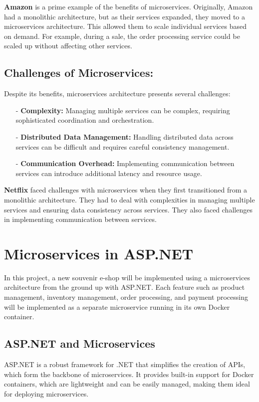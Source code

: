 \textbf{Amazon} is a prime example of the benefits of microservices. Originally, Amazon had a monolithic architecture, but as their services expanded, they moved to a microservices architecture. This allowed them to scale individual services based on demand. For example, during a sale, the order processing service could be scaled up without affecting other services.

\subsection{Challenges of Microservices:}

Despite its benefits, microservices architecture presents several challenges:
\begin{itemize}
    \item[-] \textbf{Complexity:} Managing multiple services can be complex, requiring sophisticated coordination and orchestration.
    \item[-] \textbf{Distributed Data Management:} Handling distributed data across services can be difficult and requires careful consistency management.
    \item[-] \textbf{Communication Overhead:} Implementing communication between services can introduce additional latency and resource usage.
\end{itemize}

\textbf{Netflix} faced challenges with microservices when they first transitioned from a monolithic architecture. They had to deal with complexities in managing multiple services and ensuring data consistency across services. They also faced challenges in implementing communication between services.

\section{Microservices in ASP.NET}
In this project, a new souvenir e-shop will be implemented using a microservices architecture from the ground up with ASP.NET. Each feature such as product management, inventory management, order processing, and payment processing will be implemented as a separate microservice running in its own Docker container.
\subsection{ASP.NET and Microservices}
ASP.NET is a robust framework for .NET that simplifies the creation of APIs, which form the backbone of microservices. It provides built-in support for Docker containers, which are lightweight and can be easily managed, making them ideal for deploying microservices.

